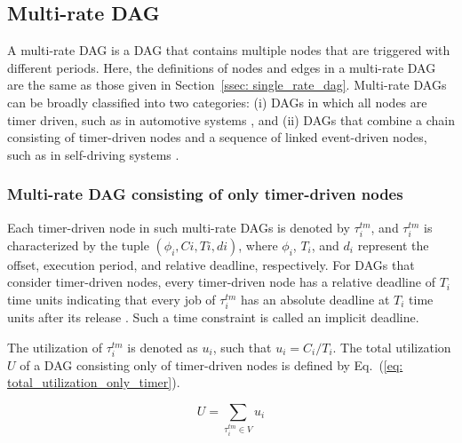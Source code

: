 \subsection{Multi-rate DAG}
\label{ssec: multi_rate_dag}

A multi-rate DAG is a DAG that contains multiple nodes that are triggered with different periods.
Here, the definitions of nodes and edges in a multi-rate DAG are the same as those given in Section~\ref{ssec: single_rate_dag}.
Multi-rate DAGs can be broadly classified into two categories: (i) DAGs in which all nodes are timer driven, such as in automotive systems \cite{kordon2020evaluation, verucchi2020latency}, and (ii) DAGs that combine a chain consisting of timer-driven nodes and a sequence of linked event-driven nodes, such as in self-driving systems \cite{choi2021picas, tang2020response}.


\subsubsection{Multi-rate DAG consisting of only timer-driven nodes}
\label{sssec: dag_only_timer}

Each timer-driven node in such multi-rate DAGs is denoted by $\tau^{tm}_i$, and $\tau^{tm}_i$ is characterized by the tuple $(\phi_i, Ci, Ti, di)$, where $\phi_i$, $T_i$, and $d_i$ represent the offset, execution period, and relative deadline, respectively.
For DAGs that consider timer-driven nodes, every timer-driven node has a relative deadline of $T_i$ time units indicating that every job of $\tau^{tm}_i$ has an absolute deadline at $T_i$ time units after its release \cite{yang2020mixed, cho2021conditionally}.
Such a time constraint is called an implicit deadline.

The utilization of $\tau^{tm}_i$ is denoted as $u_i$, such that $u_i = C_i / T_i$.
The total utilization $U$ of a DAG consisting only of timer-driven nodes is defined by Eq.~(\ref{eq: total_utilization_only_timer}).

\begin{equation}
    \label{eq: total_utilization_only_timer}
    U = \sum_{\tau^{tm}_i \in V}u_i
\end{equation}


